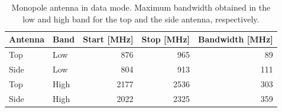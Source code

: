 \begin{table}[htbp]
  \centering
  \begin{tabular}{|l|l|r|r|r|}
    \hline
    Antenna & Band & Start [MHz] & Stop [MHz] & Bandwidth [MHz] \\
    \hline
    Top     & Low  &  876  & 965  & 89 \\
    Side    & Low  &  804  & 913  & 111 \\
    \hline
    Top     & High & 2177  & 2536   & 303 \\
    Side    & High & 2022 &  2325 & 359 \\
    \hline
  \end{tabular}
  \caption{Monopole antenna in data mode. Maximum bandwidth obtained in the low and high band for the top and the side antenna, respectively.}    
  \label{tab:bw_mono_modi_pm}
\end{table}

